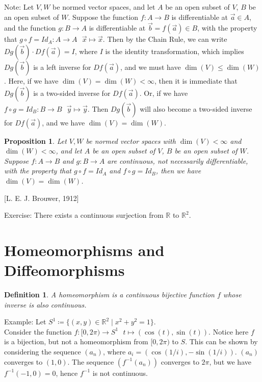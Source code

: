 \documentclass[11pt,oneside]{book}
\theoremstyle{break}
\theoremstyle{break}
\newtheorem{prop}[lem]{Proposition}
\newtheorem{defn}{Definition}[corL]
\newcommand{\R}{\mathbb{R}}
\newcommand{\note}{\color{red}Note: \color{black}}
\newcommand{\example}{\color{green}Example: \color{black}}
\newcommand{\exercise}{\color{green}Exercise: \color{black}}
\begin{document}
\note Let $V,W$ be normed vector spaces, and let $A$ be an open subset of $V$, $B$ be an open subset of $W$. Suppose the function $f:A \to B$ is differentiable at $\vec{a}\in A$, and the function $g:B \to A$ is differentiable at $\vec{b} = f(\vec{a}) \in B$, with the property that $g\circ f = Id_A : A \to A \ \ \ \vec{x}\mapsto \vec{x}$. Then by the Chain Rule, we can write $Dg(\vec{b})\cdot Df(\vec{a}) = I$, where $I$ is the identity transformation, which implies $Dg(\vec{b})$ is a left inverse for $Df(\vec{a})$, and we must have $\dim(V) \leq \dim(W)$. Here, if we have $\dim(V) = \dim(W)< \infty$, then  it is immediate that $Dg(\vec{b})$ is a two-sided inverse for $Df(\vec{a})$. Or, if we have $f\circ g = Id_B: B \to B \ \ \ \vec{y}\mapsto \vec{y}$. Then $Dg(\vec{b})$ will also become a two-sided inverse for $Df(\vec{a})$, and we have $\dim(V) = \dim(W)$.\\

\begin{prop}
Let $V,W$ be normed vector spaces with $\dim(V)<\infty$ and $\dim(W) < \infty$, and let $A$ be an open subset of $V$, $B$ be an open subset of $W$. Suppose $f:A \to B$ and $g:B \to A$ are continuous, not necessarily differentiable, with the property that $g\circ f = Id_A$ and $f\circ g = Id_B$, then we have $\dim(V) = \dim(W)$.
\end{prop}
\hfill [L. E. J. Brouwer, 1912]\\
\hfill\break

\exercise There exists a continuous surjection from $\R$ to $\R^2$.\\

\newpage
\section[Homeomorphisms and Diffeomorphisms]{\color{red} Homeomorphisms and Diffeomorphisms \color{black}}

\begin{defn}
A homeomorphism is a continuous bijective function $f$ whose inverse is also continuous. 
\end{defn} 

\example Let $S^1\coloneqq\{(x,y) \in\R^2 \mid x^2 + y^2 = 1\}$.\\
Consider the function $f:[0,2\pi) \to S^1 \ \ \ t\mapsto (\cos(t),\sin(t))$. Notice here $f$ is a bijection, but not a homeomorphism from $[0,2\pi)$ to $S$. This can be shown by considering the sequence $(a_n)$, where $a_i = (\cos(1/i),-\sin(1/i))$. $(a_n)$ converges to $(1,0)$. The sequence $(f^{-1}(a_n))$ converges to $2\pi$, but we have $f^{-1}(-1,0) = 0$, hence $f^{-1}$ is not continuous.
\end{document}
